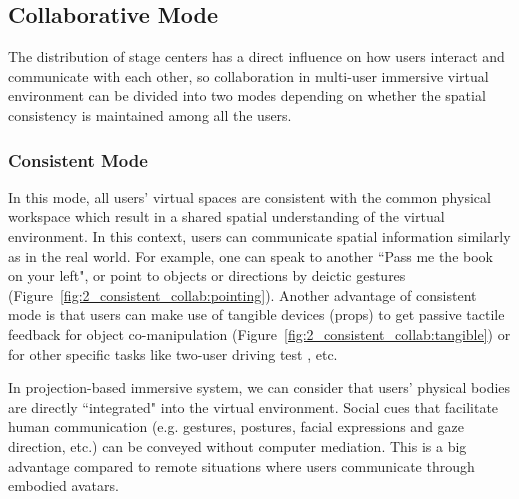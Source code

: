 \subsection{Collaborative Mode}
The distribution of stage centers has a direct influence on how users interact and communicate with each other, so collaboration in multi-user immersive virtual environment can be divided into two modes depending on whether the spatial consistency is maintained among all the users.


\subsubsection{Consistent Mode}
In this mode, all users' virtual spaces are consistent with the common physical workspace which result in a shared spatial understanding of the virtual environment. In this context, users can communicate spatial information similarly as in the real world. For example, one can speak to another ``Pass me the book on your left", or point to objects or directions by deictic gestures \citep{Salzmann2009VRPointing} (Figure~\ref{fig:2_consistent_collab:pointing}). Another advantage of consistent mode is that users can make use of tangible devices (props) to get passive tactile feedback for object co-manipulation \citep{Aguerreche2009Three, Salzmann2009CIC} (Figure~\ref{fig:2_consistent_collab:tangible}) or for other specific tasks like two-user driving test \citep{Salzmann2008TUS}, etc.

In projection-based immersive system, we can consider that users' physical bodies are directly ``integrated" into the virtual environment. Social cues that facilitate human communication (e.g. gestures, postures, facial expressions and gaze direction, etc.) can be conveyed without computer mediation. This is a big advantage compared to remote situations where users communicate through embodied avatars. 


